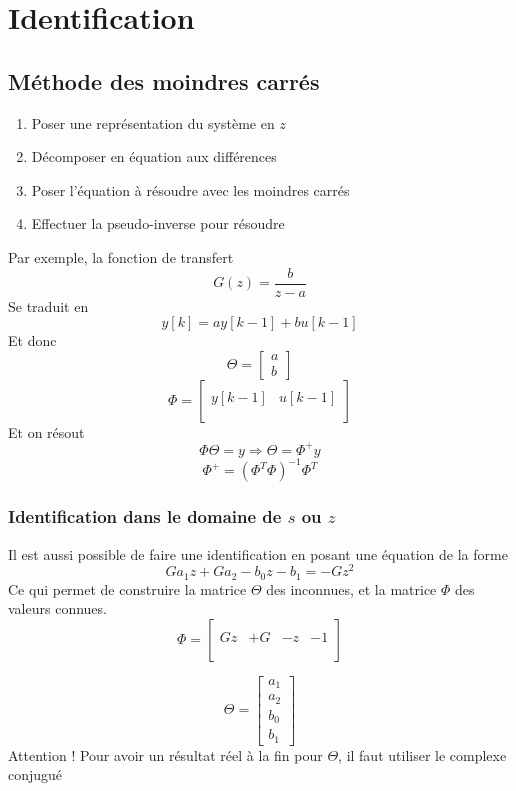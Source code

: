 \documentclass[resume]{subfiles}
\begin{document}
\section{Identification}
\subsection{Méthode des moindres carrés}
\begin{enumerate}
\item Poser une représentation du système en $z$
\item Décomposer en équation aux différences
\item Poser l'équation à résoudre avec les moindres carrés
\item Effectuer la pseudo-inverse pour résoudre
\end{enumerate}
Par exemple, la fonction de transfert
$$G(z)=\frac{b}{z-a}$$
Se traduit en
$$y[k]=ay[k-1]+bu[k-1]$$
Et donc
$$\Theta=\begin{bmatrix}
a\\b
\end{bmatrix}$$
$$\Phi=\begin{bmatrix}\\
y[k-1] & u[k-1]\\
\\
\end{bmatrix}$$
Et on résout
$$\Phi\Theta=y\Longrightarrow \boxed{\Theta=\Phi^{+}y}$$
$$\boxed{\Phi^+=\left(\Phi^T\Phi\right)^{-1}\Phi^T}$$
\subsubsection{Identification dans le domaine de $s$ ou $z$}
Il est aussi possible de faire une identification en posant une équation de la forme
$$Ga_1z+Ga_2-b_0z-b_1=-Gz^2$$
Ce qui permet de construire la matrice $\Theta$ des inconnues, et la matrice $\Phi$ des valeurs connues.
$$\Phi=\begin{bmatrix}\\
Gz& +G& -z& -1\\
\\\end{bmatrix}$$

$$\Theta = \begin{bmatrix}a_1\\a_2\\b_0\\b_1\end{bmatrix}$$
Attention ! Pour avoir un résultat réel à la fin pour $\Theta$, il faut utiliser le complexe conjugué
\end{document}
